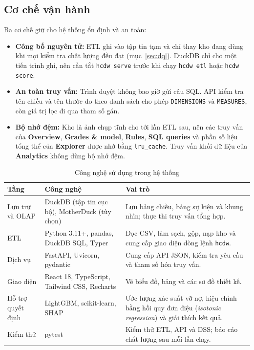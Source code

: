 \subsection{Cơ chế vận hành}
Ba cơ chế giữ cho hệ thống ổn định và an toàn:
\begin{itemize}[topsep=0pt, itemsep=1pt]
	\item \textbf{Công bố nguyên tử:} ETL ghi vào tập tin tạm và chỉ thay kho đang dùng khi mọi kiểm tra chất lượng đều đạt (mục~\ref{sec:dq}). DuckDB chỉ cho một tiến trình ghi, nên cần tắt \texttt{hcdw serve} trước khi chạy \texttt{hcdw etl} hoặc \texttt{hcdw score}.
	\item \textbf{An toàn truy vấn:} Trình duyệt không bao giờ gửi câu SQL. API kiểm tra tên chiều và tên thước đo theo danh sách cho phép \texttt{DIMENSIONS} và \texttt{MEASURES}, còn giá trị lọc đi qua tham số gán.
	\item \textbf{Bộ nhớ đệm:} Kho là ảnh chụp tĩnh cho tới lần ETL sau, nên các truy vấn của \textbf{Overview}, \textbf{Grades \& model}, \textbf{Rules}, \textbf{SQL queries} và phần số liệu tổng thể của \textbf{Explorer} được nhớ bằng \texttt{lru\_cache}. Truy vấn khối dữ liệu của \textbf{Analytics} không dùng bộ nhớ đệm.
\end{itemize}

\begin{table}[H]
	\centering
	\caption{Công nghệ sử dụng trong hệ thống}
	\label{tab:tech-stack}
	\footnotesize
	\begin{tabular}{p{3.4cm} p{5.4cm} p{6.6cm}}
		\toprule
		\textbf{Tầng}     & \textbf{Công nghệ}                             & \textbf{Vai trò}                                                                                                 \\
		\midrule
		Lưu trữ và OLAP   & DuckDB (tập tin cục bộ), MotherDuck (tùy chọn) & Lưu bảng chiều, bảng sự kiện và khung nhìn; thực thi truy vấn tổng hợp.                                          \\
		ETL               & Python 3.11+, pandas, DuckDB SQL, Typer        & Đọc CSV, làm sạch, gộp, nạp kho và cung cấp giao diện dòng lệnh \texttt{hcdw}.                                   \\
		Dịch vụ           & FastAPI, Uvicorn, pydantic                     & Cung cấp API JSON, kiểm tra yêu cầu và tham số hóa truy vấn.                                                     \\
		Giao diện         & React 18, TypeScript, Tailwind CSS, Recharts   & Vẽ biểu đồ, bảng và các sơ đồ thiết kế.                                                                          \\
		Hỗ trợ quyết định & LightGBM, scikit-learn, SHAP                   & Ước lượng xác suất vỡ nợ, hiệu chỉnh bằng hồi quy đơn điệu (\textit{isotonic regression}) và giải thích kết quả. \\
		Kiểm thử          & pytest                                         & Kiểm thử ETL, API và DSS; báo cáo chất lượng sau mỗi lần chạy.                                                   \\
		\bottomrule
	\end{tabular}
\end{table}

